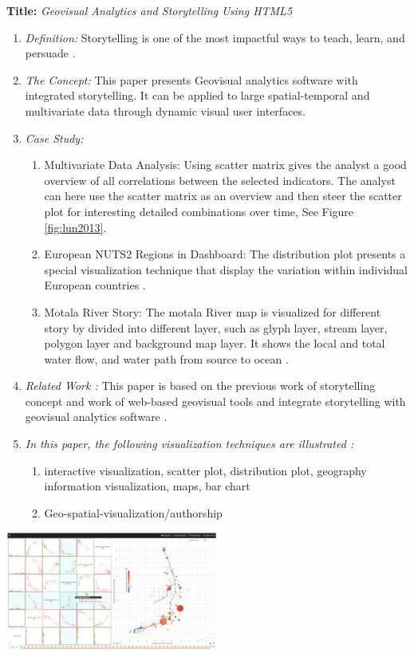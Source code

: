 \documentclass{egpubl}
\begin{document}
\textbf{Title:} \textit{Geovisual Analytics and Storytelling Using HTML5}
\begin{enumerate}
\item \textit{Definition:} Storytelling is one of the most impactful ways to teach, learn, and persuade \cite{lundblad2013}. 
\item \textit{The Concept:} This paper presents Geovisual analytics software with integrated storytelling. It can be applied to large spatial-temporal and multivariate data through dynamic visual user interfaces. 
\item  \textit{Case Study:} 
\begin{enumerate}
\item Multivariate Data Analysis: Using scatter matrix gives the analyst a good overview of all correlations between the selected
indicators. The analyst can here use the scatter matrix as an overview and then steer the scatter plot for interesting detailed combinations over time, See Figure \ref{fig:lun2013}\cite{lundblad2013}.
\item European NUTS2 Regions in Dashboard: The distribution plot presents a special visualization technique that display the variation within individual European countries \cite{lundblad2013}.
\item Motala River Story: The motala River map is visualized for different story by divided into different layer, such as glyph layer, stream layer, polygon layer and background map layer. It shows the local and total water flow, and water path from source to ocean \cite{lundblad2013}.
\end{enumerate}
\item \textit{Related Work :} This paper is based on the previous work of storytelling concept and work of web-based geovisual tools and integrate storytelling with geovisual analytics software \cite{lundblad2013}.
\item \textit{In this paper, the following visualization techniques are illustrated :} 
\begin{enumerate}
\item interactive visualization, scatter plot, distribution plot, geography information visualization, maps, bar chart
\item Geo-spatial-visualization/authorship
\end{enumerate}
\end{enumerate}

\begingroup
\centering
\includegraphics[width=7cm]{./images/lun2013}
\label{fig:lun2013}
\endgroup
\end{document}
